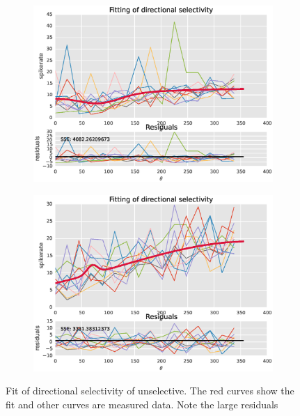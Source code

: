 \documentclass[11pt]{article}
\begin{document}
\begin{figure}
\begin{subfigure}{.48\textwidth}
        \includegraphics[width=\linewidth]{plots/fit_unsel3}
    \end{subfigure}
    \begin{subfigure}{.48\textwidth}
        \centering
        \includegraphics[width=\linewidth]{plots/fit_unsel4}
    \end{subfigure}
    \caption{Fit of directional selectivity of unselective. The red curves show the fit and other curves are measured data. Note the large residuals}
    \label{fit_unsel}
\end{figure}



\FloatBarrier
\end{document}
